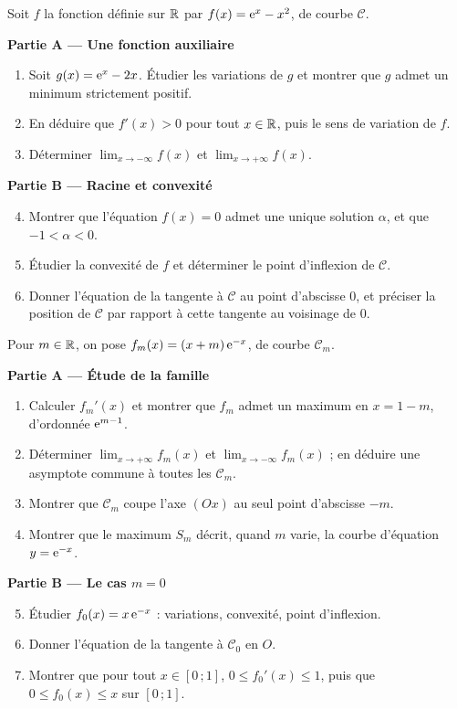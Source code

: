 Soit $f$ la fonction définie sur $\mathbb{R}$ par $f(x)=\mathrm{e}^{x}-x^{2}$, de courbe
$\mathcal C$.

\textbf{Partie A — Une fonction auxiliaire}
\begin{enumerate}
	\item Soit $g(x)=\mathrm{e}^{x}-2x$. Étudier les variations de $g$ et montrer que
	$g$ admet un minimum strictement positif.
	\item En déduire que $f'(x)>0$ pour tout $x\in\mathbb{R}$, puis le sens de
	variation de $f$.
	\item Déterminer $\displaystyle\lim_{x\to-\infty}f(x)$ et
	$\displaystyle\lim_{x\to+\infty}f(x)$.
\end{enumerate}

\textbf{Partie B — Racine et convexité}
\begin{enumerate}
	\setcounter{enumi}{3}
	\item Montrer que l'équation $f(x)=0$ admet une unique solution $\alpha$,
	et que $-1<\alpha<0$.
	\item Étudier la convexité de $f$ et déterminer le point d'inflexion de
	$\mathcal C$.
	\item Donner l'équation de la tangente à $\mathcal C$ au point d'abscisse
	$0$, et préciser la position de $\mathcal C$ par rapport à cette tangente
	au voisinage de $0$.
\end{enumerate}

Pour $m\in\mathbb{R}$, on pose $f_m(x)=(x+m)\,\mathrm{e}^{-x}$, de courbe $\mathcal C_m$.

\textbf{Partie A — Étude de la famille}
\begin{enumerate}
	\item Calculer $f_m'(x)$ et montrer que $f_m$ admet un maximum en
	$x=1-m$, d'ordonnée $\mathrm{e}^{m-1}$.
	\item Déterminer $\displaystyle\lim_{x\to+\infty}f_m(x)$ et
	$\displaystyle\lim_{x\to-\infty}f_m(x)$ ; en déduire une asymptote
	commune à toutes les $\mathcal C_m$.
	\item Montrer que $\mathcal C_m$ coupe l'axe $(Ox)$ au seul point
	d'abscisse $-m$.
	\item Montrer que le maximum $S_m$ décrit, quand $m$ varie, la courbe
	d'équation $y=\mathrm{e}^{-x}$.
\end{enumerate}

\textbf{Partie B — Le cas $m=0$}
\begin{enumerate}
	\setcounter{enumi}{4}
	\item Étudier $f_0(x)=x\,\mathrm{e}^{-x}$ : variations, convexité, point
	d'inflexion.
	\item Donner l'équation de la tangente à $\mathcal C_0$ en $O$.
	\item Montrer que pour tout $x\in[0\,;1]$, $0\leq f_0'(x)\leq 1$, puis que
	$0\leq f_0(x)\leq x$ sur $[0\,;1]$.
\end{enumerate}

